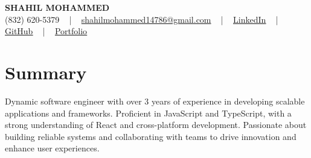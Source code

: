 \documentclass[letterpaper,10pt]{article}
\begin{document}
\begin{center}
    {\fontsize{14pt}{12pt}\selectfont \textbf{\MakeUppercase{Shahil Mohammed}}}\\ \vspace{2pt}
    \fontsize{10pt}{12pt}\selectfont (832) 620-5379 ~ | ~ \href{mailto:shahilmohammed14786@gmail.com}{shahilmohammed14786@gmail.com} ~ | ~  
    \href{https://www.linkedin.com/in/shahil-mohammed-9652931a1/}{\color{blue}\underline{LinkedIn}}  ~ | ~ 
    \href{https://github.com/freakbeast14}{\color{blue}\underline{GitHub}} ~ | ~ 
    \href{https://shahil-mohammed.netlify.app/}{\color{blue}\underline{Portfolio}}
    \vspace{-8pt}
\end{center}

\section{Summary}
\vspace{-2pt}\fontsize{8pt}{9pt}\selectfont
Dynamic software engineer with over 3 years of experience in developing scalable applications and frameworks. Proficient in JavaScript and TypeScript, with a strong understanding of React and cross-platform development. Passionate about building reliable systems and collaborating with teams to drive innovation and enhance user experiences.
 \vspace{-5pt}
 
\vspace{-2pt}
\end{document}
